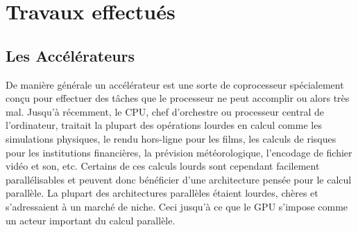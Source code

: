 \documentclass[11pt]{article}
\begin{document}
	\section{Travaux effectués}
		\subsection{Les Accélérateurs}
			De manière générale un accélérateur est une sorte de coprocesseur spécialement conçu pour effectuer des tâches que le processeur ne peut 
			accomplir ou alors très mal. \newline
			Jusqu'à récemment, le CPU, chef d'orchestre ou processeur central de l'ordinateur, traitait la plupart des opérations lourdes en calcul 
			comme les simulations physiques, le rendu hors-ligne pour les films, les calculs de risques pour les institutions financières, la 
			prévision météorologique, l'encodage de fichier vidéo et son, etc. \newline
			Certains de ces calculs lourds sont cependant facilement parallélisables et peuvent donc bénéficier d'une architecture pensée pour le 
			calcul parallèle. La plupart des architectures parallèles étaient lourdes, chères et s'adressaient à un marché de niche. Ceci jusqu'à ce 
			que le GPU s'impose comme un acteur important du calcul parallèle.
\end{document}
